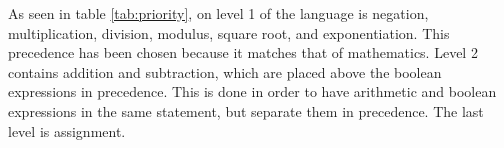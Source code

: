 As seen in table \ref{tab:priority}, on level 1 of the language is negation, multiplication, division, modulus, square root, and exponentiation. This precedence has been chosen because it matches that of mathematics. Level 2 contains addition and subtraction, which are placed above the boolean expressions in precedence. This is done in order to have arithmetic and boolean expressions in the same statement, but separate them in precedence. The last level is assignment.

